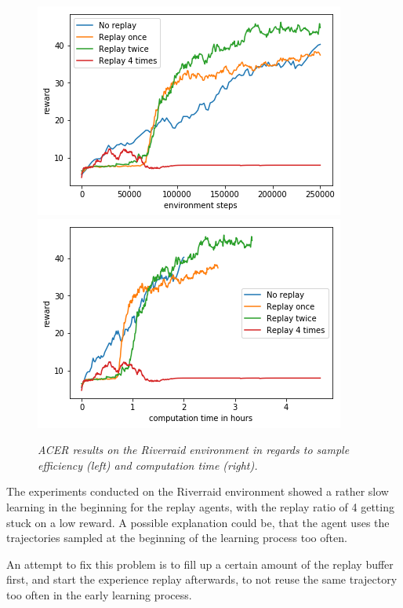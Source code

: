 \begin{figure}[h]
\includegraphics[scale=0.55]{bilder/riverraidbyonline.png}
\includegraphics[scale=0.55]{bilder/riverraidbytime.png}
\caption{\textit{ACER results on the Riverraid environment in regards to sample efficiency (left) and computation time (right).}}

\end{figure}


The experiments conducted on the Riverraid environment showed a rather slow learning in the beginning for the replay agents, with the replay ratio of 4 getting stuck on a low reward. A possible explanation could be, that the agent uses the trajectories sampled at the beginning of the learning process too often.

An attempt to fix this problem is to fill up a certain amount of the replay buffer first, and start the experience replay afterwards, to not reuse the same trajectory too often in the early learning process.


